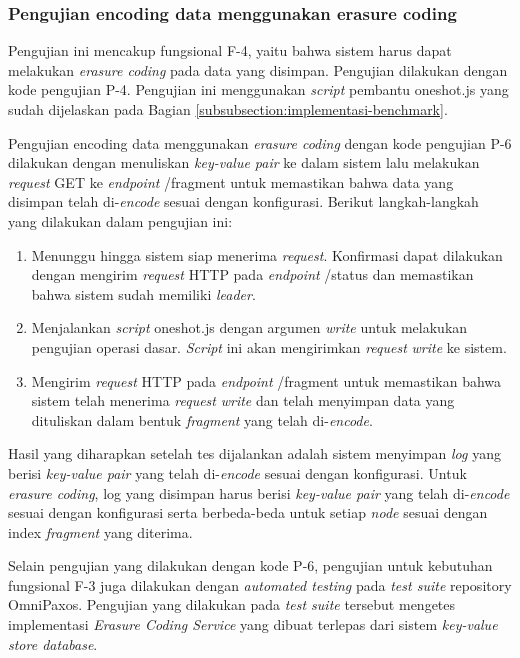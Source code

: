 \subsubsection{Pengujian encoding data menggunakan erasure coding}
\label{subsubsection:pengujian-encoding-data-erasure-coding}

Pengujian ini mencakup fungsional F-4, yaitu bahwa sistem harus dapat melakukan \textit{erasure coding} pada data yang disimpan. Pengujian dilakukan dengan kode pengujian P-4. Pengujian ini menggunakan \textit{script} pembantu oneshot.js yang sudah dijelaskan pada Bagian \ref{subsubsection:implementasi-benchmark}.

Pengujian encoding data menggunakan \textit{erasure coding} dengan kode pengujian P-6 dilakukan dengan menuliskan \textit{key-value pair} ke dalam sistem lalu melakukan \textit{request} GET ke \textit{endpoint} /fragment untuk memastikan bahwa data yang disimpan telah di-\textit{encode} sesuai dengan konfigurasi. Berikut langkah-langkah yang dilakukan dalam pengujian ini:

\begin{enumerate}
	\item Menunggu hingga sistem siap menerima \textit{request}. Konfirmasi dapat dilakukan dengan mengirim \textit{request} HTTP pada \textit{endpoint} /status dan memastikan bahwa sistem sudah memiliki \textit{leader}.
	\item Menjalankan \textit{script} oneshot.js dengan argumen \textit{write} untuk melakukan pengujian operasi dasar. \textit{Script} ini akan mengirimkan \textit{request} \textit{write} ke sistem.
	\item Mengirim \textit{request} HTTP pada \textit{endpoint} /fragment untuk memastikan bahwa sistem telah menerima \textit{request} \textit{write} dan telah menyimpan data yang dituliskan dalam bentuk \textit{fragment} yang telah di-\textit{encode}.
\end{enumerate}

Hasil yang diharapkan setelah tes dijalankan adalah sistem menyimpan \textit{log} yang berisi \textit{key-value pair} yang telah di-\textit{encode} sesuai dengan konfigurasi. Untuk \textit{erasure coding}, log yang disimpan harus berisi \textit{key-value pair} yang telah di-\textit{encode} sesuai dengan konfigurasi serta berbeda-beda untuk setiap \textit{node} sesuai dengan index \textit{fragment} yang diterima.

Selain pengujian yang dilakukan dengan kode P-6, pengujian untuk kebutuhan fungsional F-3 juga dilakukan dengan \textit{automated testing} pada \textit{test suite} repository OmniPaxos. Pengujian yang dilakukan pada \textit{test suite} tersebut mengetes implementasi \textit{Erasure Coding Service} yang dibuat terlepas dari sistem \textit{key-value store database}.